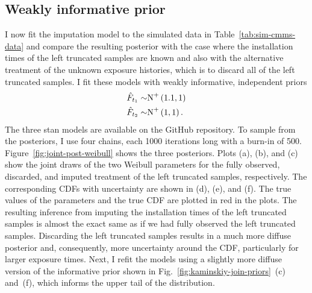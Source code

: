 

\subsection{Weakly informative prior} \label{subsec:weibull-model-fits}

I now fit the imputation model to the simulated data in Table~\ref{tab:sim-cmms-data} and compare the resulting posterior with the case where the installation times of the left truncated samples are known and also with the alternative treatment of the unknown exposure histories, which is to discard all of the left truncated samples. I fit these models with weakly informative, independent priors
\begin{align*}
    \hat{F}_{t_1} \sim & \hbox{N}^{+}\left(1.1, 1\right)  \\
    \hat{F}_{t_2} \sim & \hbox{N}^{+}\left(1, 1\right).
\end{align*}
The three stan models are available on the GitHub repository. To sample from the posteriors, I use four chains, each 1000 iterations long with a burn-in of 500. Figure~\ref{fig:joint-post-weibull} shows the three posteriors. Plots (a), (b), and (c) show the joint draws of the two Weibull parameters for the fully observed, discarded, and imputed treatment of the left truncated samples, respectively. The corresponding CDFs with uncertainty are shown in (d), (e), and (f). The true values of the parameters and the true CDF are plotted in red in the plots. The resulting inference from imputing the installation times of the left truncated samples is almost the exact same as if we had fully observed the left truncated samples. Discarding the left truncated samples results in a much more diffuse posterior and, consequently, more uncertainty around the CDF, particularly for larger exposure times. Next, I refit the models using a slightly more diffuse version of the informative prior shown in Fig.~\ref{fig:kaminskiy-join-priors}~(c) and~(f), which informs the upper tail of the distribution.

